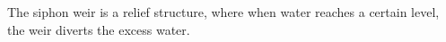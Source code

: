 The siphon weir is a relief structure, where when water reaches a certain level, the weir diverts the excess water. 